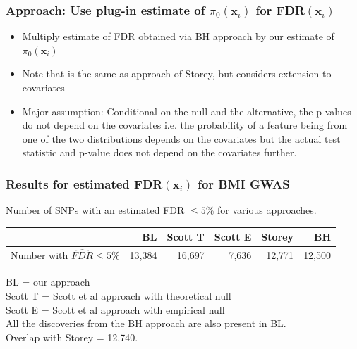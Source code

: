 \documentclass{beamer}
\newcommand{\bx}{\mathbf{x}}
\begin{document}
\begin{frame}
\frametitle{Approach: Use plug-in estimate of $\pi_0(\bx_i)$ for FDR$(\bx_i)$}

\begin{itemize}
\item Multiply estimate of FDR obtained via BH approach by our estimate of $\pi_0(\bx_i)$

\item Note that is the same as approach of Storey, but considers extension to covariates

\item Major assumption: Conditional on the null and the alternative, the p-values do not depend on the covariates
i.e. the probability of a feature being from one of the two distributions depends on the covariates but the actual test statistic and p-value
does not depend on the covariates further.
\end{itemize}

\end{frame}


\begin{frame}
\frametitle{Results for estimated FDR$(\bx_i)$ for BMI GWAS}

Number of  SNPs with an estimated FDR $\le5$\% for various approaches.

\begin{table}[ht]
\begin{tabular}{m{2.2cm}rrrrr}
  \hline
 & BL & Scott T & Scott E & Storey & BH \\ 
  \hline
Number with $\widehat{FDR} \le 5$\%  & 13,384 & 16,697 & 7,636 & 12,771 & 12,500 \\ 
   \hline
\end{tabular}
\end{table}

\vspace{0.5cm}
BL = our approach \\
Scott T = Scott et al approach with theoretical null \\
Scott E = Scott et al approach with empirical null \\

\vspace{0.5cm}
All the discoveries from the BH approach are also present in BL.\\
Overlap with Storey = 12,740.

\end{frame}
\end{document}
